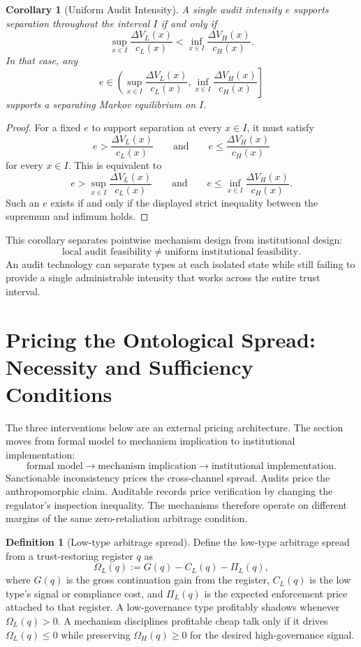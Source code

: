 \documentclass[preprint,authoryear]{elsarticle}
\newtheorem{corollary}{Corollary}
\theoremstyle{definition}
\newtheorem{definition}{Definition}
\theoremstyle{plain}
\begin{document}
\begin{corollary}[Uniform Audit Intensity]
\label{cor:uniform-audit-intensity}
A single audit intensity $e$ supports separation throughout the interval $I$
if and only if
\[
\sup_{x\in I}
\frac{\Delta V_L(x)}{c_L(x)}
<
\inf_{x\in I}
\frac{\Delta V_H(x)}{c_H(x)}.
\]
In that case, any
\[
e\in
\left(
\sup_{x\in I}\frac{\Delta V_L(x)}{c_L(x)},
\inf_{x\in I}\frac{\Delta V_H(x)}{c_H(x)}
\right]
\]
supports a separating Markov equilibrium on $I$.
\end{corollary}
\begin{proof}
For a fixed $e$ to support separation at every $x\in I$, it must satisfy
\[
e>
\frac{\Delta V_L(x)}{c_L(x)}
\qquad\text{and}\qquad
e\le
\frac{\Delta V_H(x)}{c_H(x)}
\]
for every $x\in I$.  This is equivalent to
\[
e>
\sup_{x\in I}
\frac{\Delta V_L(x)}{c_L(x)}
\qquad\text{and}\qquad
e\le
\inf_{x\in I}
\frac{\Delta V_H(x)}{c_H(x)}.
\]
Such an $e$ exists if and only if the displayed strict inequality between the
supremum and infimum holds.
\end{proof}

This corollary separates pointwise mechanism design from institutional design:
\[
\text{local audit feasibility}
\neq
\text{uniform institutional feasibility}.
\]
An audit technology can separate types at each isolated state while still
failing to provide a single administrable intensity that works across the
entire trust interval.
\section{Pricing the Ontological Spread: Necessity and Sufficiency Conditions}
\label{sec:mechanism}

The three interventions below are an external pricing architecture.  The
section moves from formal model to mechanism implication to institutional
implementation:
\[
\text{formal model}
\to
\text{mechanism implication}
\to
\text{institutional implementation}.
\]
Sanctionable inconsistency prices the cross-channel spread.  Audits price the
anthropomorphic claim.  Auditable records price verification by changing the
regulator's inspection inequality.  The mechanisms therefore operate on
different margins of the same zero-retaliation arbitrage condition.

\begin{definition}[Low-type arbitrage spread]
\label{def:arbitrage-spread}
Define the low-type arbitrage spread from a trust-restoring register $q$ as
\[
\Omega_L(q)
  := G(q)-C_L(q)-\Pi_L(q),
\]
where $G(q)$ is the gross continuation gain from the register,
$C_L(q)$ is the low type's signal or compliance cost, and
$\Pi_L(q)$ is the expected enforcement price attached to that register.
A low-governance type profitably shadows whenever $\Omega_L(q)>0$.
A mechanism disciplines profitable cheap talk only if it drives
$\Omega_L(q)\le 0$ while preserving $\Omega_H(q)\ge 0$ for the desired
high-governance signal.
\end{definition}
\end{document}

